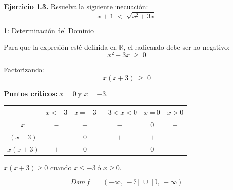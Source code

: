 \documentclass[letterpaper, 12pt]{article}
\begin{document}
\newpage

\begin{tcolorbox}[colback=azulFuerte!12, colframe=azulFuerte, arc=8pt,
    boxrule=1.2pt, enhanced]
    \textbf{\large Ejercicio 1.3.} \quad Resuelva la siguiente inecuaci\'on:
    \[
        x + 1 \;<\; \sqrt{x^2 + 3x}
    \]
\end{tcolorbox}

\bigskip

\begin{paso}{1: Determinaci\'on del Dominio}

Para que la expresi\'on est\'e definida en $\mathbb{R}$, el radicando debe ser
no negativo:
\[
    x^2 + 3x \;\geq\; 0
\]

Factorizando:
\[
    x(x + 3) \;\geq\; 0
\]

\textbf{Puntos cr\'iticos:} $x = 0$ y $x = -3$.

\medskip
\begin{center}
\renewcommand{\arraystretch}{1.5}
\begin{tabular}{c|ccccc}
    & $x < -3$ & $x = -3$ & $-3 < x < 0$ & $x = 0$ & $x > 0$ \\
\hline
$x$       & $-$ & $-$ & $-$ & $0$ & $+$ \\
$(x + 3)$ & $-$ & $0$ & $+$ & $+$ & $+$ \\
\hline
\rowcolor{celesteSuave}
$x(x+3)$  & $+$ & $0$ & $-$ & $0$ & $+$ \\
\end{tabular}
\end{center}

\medskip
$x(x+3) \geq 0$ cuando $x \leq -3$ \;\'o\; $x \geq 0$.

\[
    \boxed{Dom\,f \;=\; (-\infty,\,-3\,] \;\cup\; [\,0,\,+\infty)}
\]

\end{paso}

\bigskip
\end{document}
